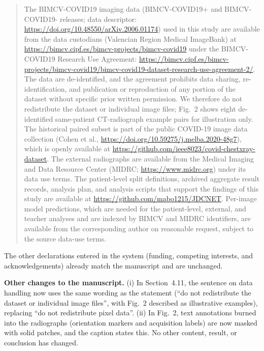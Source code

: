 \documentclass[11pt]{article}
\begin{document}
\begin{quote}
The BIMCV-COVID19 imaging data (BIMCV-COVID19+ and BIMCV-COVID19- releases;
data descriptor: \url{https://doi.org/10.48550/arXiv.2006.01174}) used in this
study are available from the data custodians (Valencian Region
Medical ImageBank) at \url{https://bimcv.cipf.es/bimcv-projects/bimcv-covid19}
under the BIMCV-COVID19 Research Use Agreement:
\url{https://bimcv.cipf.es/bimcv-projects/bimcv-covid19/bimcv-covid19-dataset-research-use-agreement-2/}.
The data are de-identified, and the agreement prohibits data sharing,
re-identification, and publication or reproduction of any portion of the
dataset without specific prior written permission. We therefore do not
redistribute the dataset or individual image files; Fig.~2 shows eight
de-identified same-patient CT-radiograph example pairs for illustration only.
The historical paired subset is part of the public COVID-19 image data
collection (Cohen et al., \url{https://doi.org/10.59275/j.melba.2020-48g7}),
which is openly available at
\url{https://github.com/ieee8023/covid-chestxray-dataset}. The external
radiographs are available from the Medical Imaging and Data Resource Center
(MIDRC; \url{https://www.midrc.org}) under its data use terms. The
patient-level split definitions, archived aggregate result records, analysis
plan, and analysis scripts that support the findings of this study are
available at \url{https://github.com/mabo1215/JDCNET}. Per-image model
predictions, which are needed for the patient-level, external, and teacher
analyses and are indexed by BIMCV and MIDRC identifiers, are available from
the corresponding author on reasonable request, subject to the source
data-use terms.
\end{quote}

The other declarations entered in the system (funding, competing interests,
and acknowledgements) already match the manuscript and are unchanged.

\textbf{Other changes to the manuscript.} (i) In Section~4.11, the sentence
on data handling now uses the same wording as the statement (``do not
redistribute the dataset or individual image files'', with Fig.~2 described as
illustrative examples), replacing ``do not redistribute pixel data''. (ii) In
Fig.~2, text annotations burned into the radiographs (orientation markers and
acquisition labels) are now masked with solid patches, and the caption states
this. No other content, result, or conclusion has changed.

\hrulefill
\end{document}
